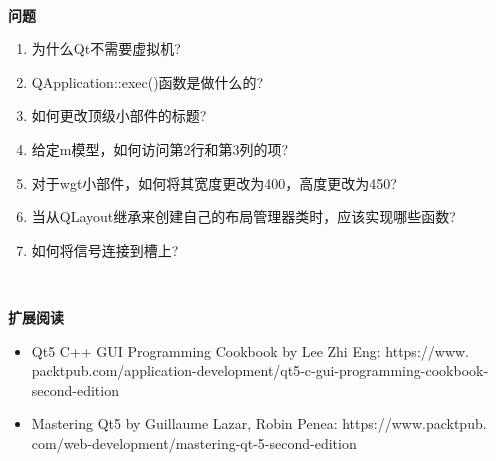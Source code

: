 \noindent\textbf{}\ \par
\textbf{问题} \ \par
\begin{enumerate}
	\item 为什么Qt不需要虚拟机?
	\item QApplication::exec()函数是做什么的?
	\item 如何更改顶级小部件的标题?
	\item 给定m模型，如何访问第2行和第3列的项?
	\item 对于wgt小部件，如何将其宽度更改为400，高度更改为450?
	\item 当从QLayout继承来创建自己的布局管理器类时，应该实现哪些函数?
	\item 如何将信号连接到槽上?
\end{enumerate}

\noindent\textbf{}\ \par
\textbf{扩展阅读} \ \par
\begin{itemize}
	\item Qt5 C++ GUI Programming Cookbook by Lee Zhi Eng:  https:/​/​www.​packtpub.​com/application-​development/​qt5-​c-​gui-​programming-​cookbook-​second-​edition
	\item Mastering Qt5 by Guillaume Lazar, Robin Penea:  https:/​/​www.​packtpub.​com/web-​development/​mastering-​qt-​5-​second-​edition
\end{itemize}

\newpage



















